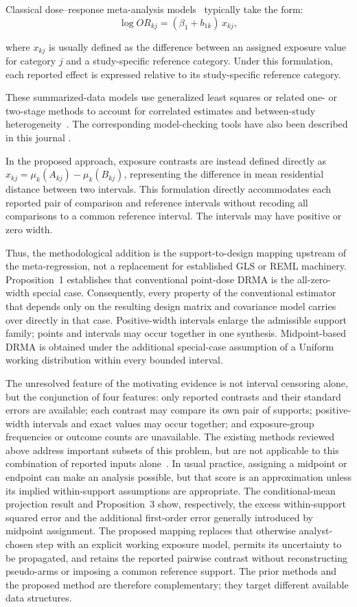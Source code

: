 \documentclass[journal=rsm]{CUP-JNL-DTM}%
\theoremstyle{definition}
\numberwithin{equation}{section}
\begin{document}
Classical dose--response meta-analysis models~\cite{Greenland1992, Orsini2012}
typically take the form:
\[
 \log OR_{kj} = (\beta_1 + b_{1k})\, x_{kj},
\]

where $x_{kj}$ is usually defined as the difference between an assigned exposure value for category $j$ and a study-specific reference category. Under this formulation, each reported effect is expressed relative to its study-specific reference category.

These summarized-data models use generalized least squares or related one- or
two-stage methods to account for correlated estimates and between-study
heterogeneity~\cite{Orsini2006,Discacciati2017,Crippa2019}. The corresponding
model-checking tools have also been described in this journal
\cite{Discacciati2017}.
 
In the proposed approach, exposure contrasts are instead defined directly as $x_{kj}=\mu_k(A_{kj})-\mu_k(B_{kj})$, representing the difference in mean residential distance between two intervals. This formulation directly accommodates each reported pair of comparison and reference intervals without recoding all comparisons to a common reference interval. The intervals may have positive or zero width.

Thus, the methodological addition is the support-to-design mapping upstream of
the meta-regression, not a replacement for established GLS or REML machinery.
Proposition~1 establishes that conventional point-dose DRMA is the all-zero-
width special case. Consequently, every property of the conventional estimator
that depends only on the resulting design matrix and covariance model carries
over directly in that case. Positive-width intervals enlarge the admissible
support family; points and intervals may occur together in one synthesis.
Midpoint-based DRMA is obtained under the additional special-case assumption
of a Uniform working distribution within every bounded interval.

The unresolved feature of the motivating evidence is not interval censoring
alone, but the conjunction of four features: only reported contrasts and their
standard errors are available; each contrast may compare its own pair of
supports; positive-width intervals and exact values may occur together; and
exposure-group frequencies or outcome counts are unavailable. The existing
methods reviewed above address important subsets of this problem, but are not
applicable to this combination of reported inputs
alone~\cite{Greenland1992,Cook2001,Allen2020,Allen2020b,Orsini2012}. In usual
practice, assigning a midpoint or endpoint can make an analysis possible, but
that score is an approximation unless its implied within-support assumptions
are appropriate. The conditional-mean projection result and Proposition~3 show,
respectively, the excess within-support squared error and the additional
first-order error generally introduced by midpoint assignment. The
proposed mapping replaces that otherwise analyst-chosen step with an explicit
working exposure model, permits its uncertainty to be propagated, and retains
the reported pairwise contrast without reconstructing pseudo-arms or imposing
a common reference support. The prior methods and the proposed method are
therefore complementary; they target different available data structures.
\end{document}

